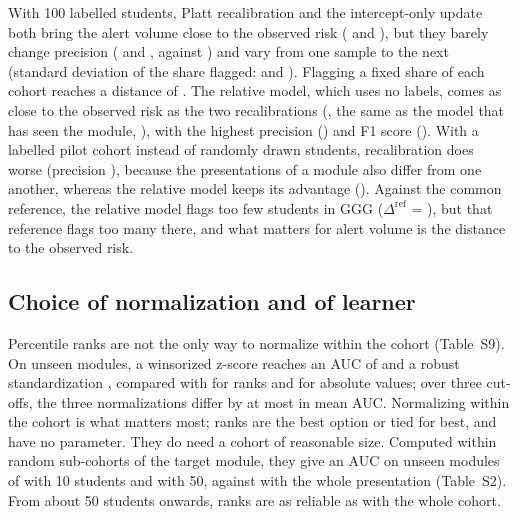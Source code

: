 \documentclass[fleqn,10pt]{JLA_article}
\newcommand{\dref}{\Delta^{\mathrm{ref}}}
\begin{document}
With 100 labelled students, Platt recalibration and the intercept-only update both bring the alert volume close to the observed risk (\resGapRiskRecal{} and \resIcptGapRisk), but they barely change precision (\resPrecRecalK{} and \resIcptPrec, against \resPrecRawK) and vary from one sample to the next (standard deviation of the share flagged: \resPlattSdFlag{} and \resIcptSdFlag). Flagging a fixed share of each cohort reaches a distance of \resGapRiskTopQ. The relative model, which uses no labels, comes as close to the observed risk as the two recalibrations (\resGapRiskRel, the same as the model that has seen the module, \resGapRiskRefA), with the highest precision (\resPrecRelK) and F1 score (\resFoneRelK). With a labelled pilot cohort instead of randomly drawn students, recalibration does worse (precision \resPrecRecalPilot), because the presentations of a module also differ from one another, whereas the relative model keeps its advantage (\resPrecRelPilot). Against the common reference, the relative model flags too few students in GGG ($\dref$ = \resGGGDriftRelCommon), but that reference flags too many there, and what matters for alert volume is the distance to the observed risk.



\subsection{Choice of normalization and of learner}
\label{sec:normalisation}
Percentile ranks are not the only way to normalize within the cohort (Table~S9). On unseen modules, a winsorized z-score reaches an AUC of \resNormZscoreAucB{} and a robust standardization \resNormRobustAucB{}, compared with \resNormRankAucB{} for ranks and \resAucAbsBTwentyFive{} for absolute values; over three cut-offs, the three normalizations differ by at most \resNormMaxSpread{} in mean AUC. Normalizing within the cohort is what matters most; ranks are the best option or tied for best, and have no parameter. They do need a cohort of reasonable size. Computed within random sub-cohorts of the target module, they give an AUC on unseen modules of \resCohortAucTen{} \resCohortAucTenCI{} with 10 students and \resCohortAucFifty{} \resCohortAucFiftyCI{} with 50, against \resCohortAucFull{} with the whole presentation (Table~S2). From about 50 students onwards, ranks are as reliable as with the whole cohort.
\end{document}

